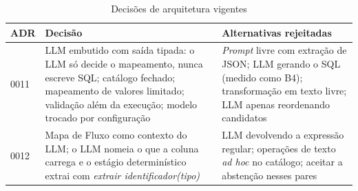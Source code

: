 \begin{table}[htbp]
\centering
\caption{Decisões de arquitetura vigentes}
\label{tab:adrs}
\footnotesize
\begin{tabularx}{\textwidth}{@{}l>{\raggedright\arraybackslash}X>{\raggedright\arraybackslash}X@{}}
\toprule
\textbf{ADR} & \textbf{Decisão} & \textbf{Alternativas rejeitadas} \\
\midrule
0011 & LLM embutido com saída tipada: o LLM só decide o mapeamento, nunca escreve SQL; catálogo fechado; mapeamento de valores limitado; validação além da execução; modelo trocado por configuração & \emph{Prompt} livre com extração de JSON; LLM gerando o SQL (medido como B4); transformação em texto livre; LLM apenas reordenando candidatos \\
0012 & Mapa de Fluxo como contexto do LLM; o LLM nomeia o que a coluna carrega e o estágio determinístico extrai com \emph{extrair identificador(tipo)} & LLM devolvendo a expressão regular; operações de texto \emph{ad hoc} no catálogo; aceitar a abstenção nesses pares \\
\bottomrule
\end{tabularx}
\end{table}
